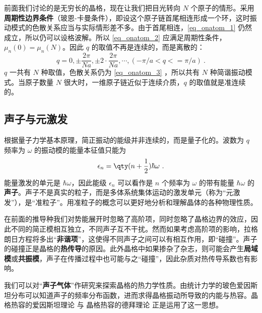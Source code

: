 前面我们讨论的是无穷长的晶格，现在让我们把目光转向 $N$ 个原子的情形。采用\textbf{周期性边界条件}（玻恩-卡曼条件），即设这个原子链首尾相连形成一个环，这时振动模式的色散关系应当与实际情形差不多。由于首尾相连，\autoref{eq_onatom_1} 仍然成立，所以仍可以设格波解。所以 \autoref{eq_onatom_2} 应满足周期性条件，$\mu_n(0)=\mu_n(N)$。因此 $q$ 的取值不再是连续的，而是离散的：
\begin{equation}
q=0,\pm \frac{2\pi}{Na},\pm 2\cdot \frac{2\pi}{Na},\cdots, (-\pi/a<q<=\pi/a)~.
\end{equation}
$q$ 一共有 $N$ 种取值，色散关系仍为 \autoref{eq_onatom_3} ，所以共有 $N$ 种简谐振动模式。当原子数量 $N$ 很大时，一维原子链近似于连续介质，$q$ 的取值就是准连续的。
\subsection{声子与元激发}

根据量子力学基本原理，简正振动的能级并非连续的，而是量子化的。波数为 $q$ 频率为 $\omega$ 的振动模的能量本征值只能为
\begin{equation}
\epsilon_n=\qty(n+\frac{1}{2})\hbar\omega~.
\end{equation}
能量激发的单元是 $\hbar\omega$，因此能级 $\epsilon_n$ 可以看作是 $n$ 个频率为 $\omega$ 的带有能量 $\hbar\omega$ 的\textbf{声子}。声子不是真实的粒子，而是多体系统集体运动的激发单元（称为“元激发”），是“准粒子”。用准粒子的概念可以更好地分析和理解晶体的各种物理性质。

在前面的推导种我们对势能展开时忽略了高阶项，同时忽略了晶格边界的效应，因此不同的简正模相互独立，不同声子互不干扰。然而如果考虑高阶项的影响，拉格朗日方程将多出“\textbf{非谐项}”，这使得不同声子之间可以有相互作用，即“碰撞”。声子的碰撞正是晶格的\textbf{热传导}的原因。此外晶格中如果掺杂了杂志，则可能会产生\textbf{局域模}或\textbf{共振模}，声子在传播过程中也可能与之“碰撞”，因此杂质对热传导系数也有影响。

我们可以对“\textbf{声子气体}”作研究来探索晶格的热力学性质。由统计力学的玻色爱因斯坦分布可以知道声子的频率分布函数，进而求得晶格振动所导致的内能与热容。晶格热容的爱因斯坦理论 与 晶格热容的德拜理论 正是运用了这一思想。
